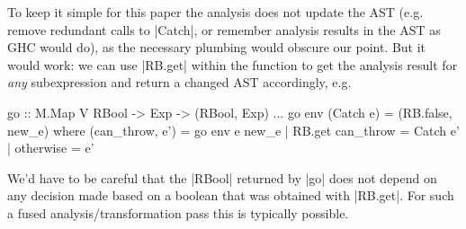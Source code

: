 \documentclass[manuscript,anonymous,screen,acmsmall]{acmart}
\begin{document}
To keep it simple for this paper the analysis does not update the AST (e.g. remove redundant calls to |Catch|, or remember analysis results in the AST as GHC would do), as the necessary plumbing would obscure our point. But it would work: we can use |RB.get| within the function to get the analysis result for \emph{any} subexpression and return a changed AST accordingly, e.g.
\restorecolumns
\begin{code}
    go :: M.Map V RBool -> Exp -> (RBool, Exp)
    ...
    go env (Catch e)        = (RB.false, new_e)
      where
        (can_throw, e') = go env e
        new_e  |  RB.get can_throw  = Catch e'
               |  otherwise         = e'
\end{code}
We'd have to be careful that the |RBool| returned by |go| does not depend on any decision made based on a boolean that was obtained with |RB.get|. For such a fused analysis/transformation pass this is typically possible.
\end{document}
